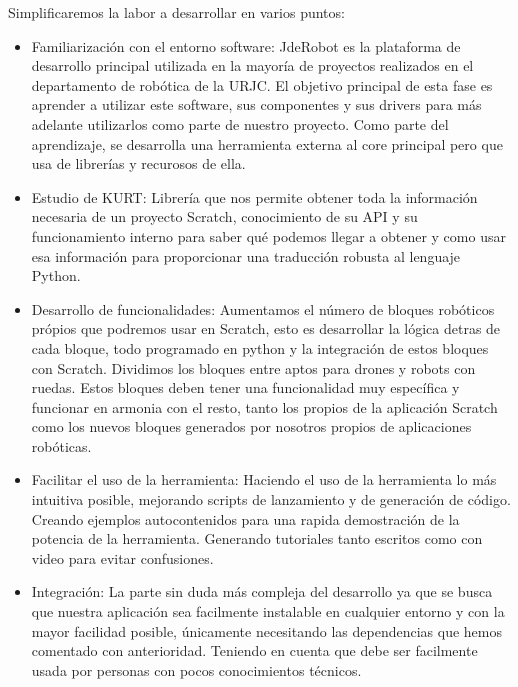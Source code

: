 Simplificaremos la labor a desarrollar en varios puntos:
\begin{itemize}
\item Familiarización con el entorno software: JdeRobot es la plataforma de desarrollo principal utilizada en la mayoría de proyectos realizados en el departamento de robótica
de la URJC. El objetivo principal de esta fase es aprender a utilizar este software, sus
componentes y sus drivers para más adelante utilizarlos como parte de nuestro proyecto.
Como parte del aprendizaje, se desarrolla una herramienta externa al core principal pero que usa de librerías y recurosos de ella.
\item Estudio de KURT: Librería que nos permite obtener toda la información necesaria de un proyecto Scratch, conocimiento de su API y su funcionamiento interno para saber qué podemos llegar a obtener y como usar esa información para proporcionar una traducción robusta al lenguaje Python.
\item Desarrollo de funcionalidades: Aumentamos el número de bloques robóticos própios que podremos usar en Scratch, esto es desarrollar la lógica detras de cada bloque, todo programado en python y la integración de estos bloques con Scratch. Dividimos los bloques entre aptos para drones y robots con ruedas. Estos bloques deben tener una funcionalidad muy específica y funcionar en armonia con el resto, tanto los propios de la aplicación Scratch como los nuevos bloques generados por nosotros propios de aplicaciones robóticas.
\item Facilitar el uso de la herramienta: Haciendo el uso de la herramienta lo más intuitiva posible, mejorando scripts de lanzamiento y de generación de código. Creando ejemplos autocontenidos para una rapida demostración de la potencia de la herramienta. Generando tutoriales tanto escritos como con video para evitar confusiones.
\item Integración: La parte sin duda más compleja del desarrollo ya que se busca que nuestra aplicación sea facilmente instalable en cualquier entorno y con la mayor facilidad posible, únicamente necesitando las dependencias que hemos comentado con anterioridad. Teniendo en cuenta que debe ser facilmente usada por personas con pocos conocimientos técnicos.


\end{itemize}
